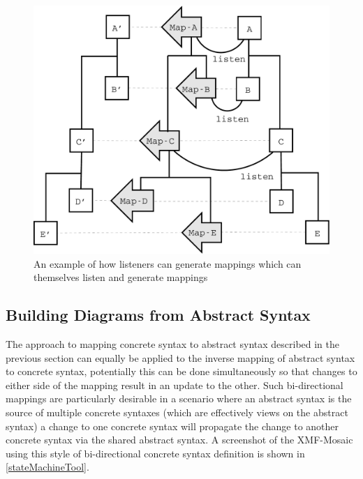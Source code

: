 \begin{figure}[htb]
\begin{center}
\includegraphics[width=14cm]{ConcreteSyntax/figures/containership.pdf}
\caption{An example of how listeners can generate mappings which can themselves listen and generate mappings}
\label{hierarchy}
\end{center}
\end{figure}

\subsection{Building Diagrams from Abstract Syntax}

The approach to mapping concrete syntax to abstract syntax described in the  previous section can equally be applied to the inverse mapping of abstract syntax to concrete syntax, potentially this can be done simultaneously so that changes to either side of the mapping result in an update to the other.  Such bi-directional mappings are particularly desirable in a scenario where an abstract syntax is the source of multiple concrete syntaxes (which are effectively views on the abstract syntax) a change to one concrete syntax will propagate the change to another concrete syntax via the shared abstract syntax.  A screenshot of the XMF-Mosaic using this style of bi-directional concrete syntax definition is shown in \ref{stateMachineTool}.

